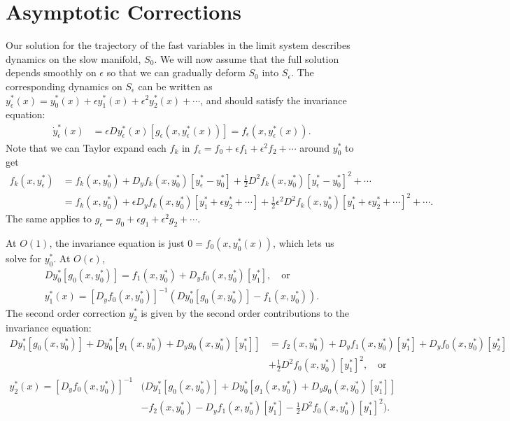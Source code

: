 \documentclass{article}
\newcommand{\ep}{\epsilon}
\newcommand{\pth} [1] {\left( #1 \right) }
\begin{document}
\section{Asymptotic Corrections} \label{asymptotic corrections}
Our solution for the trajectory of the fast variables in the limit system describes dynamics on the slow manifold, $S_0$. We will now assume that the full solution depends smoothly on $\ep$ so that we can gradually deform $S_0$ into $S_\ep$. The corresponding dynamics on $S_\ep$ can be written as $y^*_\ep(x) = y^*_0(x) + \ep y^*_1(x) + \ep^2y^*_2(x) + \cdots$, and should satisfy the invariance equation: 
\begin{align} \label{invariance}
    \dot{y}_\ep^*(x) &= \ep Dy^*_\ep(x)[g_\ep(x,y^*_\ep(x))] = f_\ep(x,y^*_\ep(x)).
\end{align}
Note that we can Taylor expand each $f_k$ in $f_\ep = f_0 + \ep f_1 + \ep^2 f_2 + \cdots$ around $y_0^*$ to get
\begin{align*} 
    f_k(x,y_\ep^*) &= f_k(x,y_0^*) + D_yf_k(x,y_0^*)[y_\ep^*-y_0^*] + \frac{1}{2}D^2f_k(x,y_0^*)[y_\ep^*-y_0^*]^2 + \cdots \\ 
    &= f_k(x,y_0^*) + \ep D_yf_k(x,y_0^*)[y_1^*+\ep y_2^*+\cdots] + \frac{1}{2}\ep^2 D^2f_k(x,y_0^*)[y_1^*+\ep y_2^*+\cdots]^2 + \cdots.
\end{align*}
The same applies to $g_\ep = g_0 + \ep g_1 + \ep^2 g_2 + \cdots$. 

At $O(1)$, the invariance equation is just $0=f_0\pth{x,y^*_0(x)}$, which lets us solve for $y_0^*$. At $O(\ep)$,    
\begin{align*}
    Dy^*_0[g_0\pth{x,y_0^*}] = f_1(x,y_0^*) + D_yf_0(x,y_0^*)[y^*_1], \quad\text{or} \\ 
    y_1^*(x) = [D_yf_0(x,y_0^*)]^{-1} \pth{Dy_0^*[g_0(x,y_0^*)] - f_1(x,y_0^*)}.  
\end{align*}
The second order correction $y_2^*$ is given by the second order contributions to the invariance equation: 
\begin{align*}
    Dy_1^*[g_0(x,y_0^*)] + Dy_0^*[g_1(x,y_0^*) + D_yg_0(x,y_0^*)[y_1^*]] &= f_2(x,y_0^*) + D_yf_1(x,y_0^*)[y_1^*] + D_yf_0(x,y_0^*)[y_2^*] \\ 
    &+ \frac{1}{2}D^2f_0(x,y_0^*)[y_1^*]^2, \quad\text{or} 
\end{align*}
\begin{align*}
    y_2^*(x) = [D_yf_0(x,y_0^*)]^{-1} & \biggl( Dy_1^*[g_0(x,y_0^*)] + Dy_0^*[g_1(x,y_0^*) + D_yg_0(x,y_0^*)[y_1^*]] \\ 
    &- f_2(x,y_0^*) - D_yf_1(x,y_0^*)[y_1^*] - \frac{1}{2}D^2f_0(x,y_0^*)[y_1^*]^2 \biggr). 
\end{align*}
\end{document}
